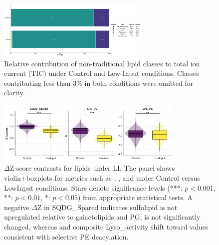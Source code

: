 \documentclass[10pt,letterpaper]{article}
\begin{document}





\begin{figure}[htp]
  \centering
  \includegraphics[width=0.65\textwidth]{fig/supp/SuppFig_4_TIC_nontraditional_lipid_class.png}
  \caption{Relative contribution of non-traditional lipid classes to total ion current (TIC) under Control and Low-Input conditions. Classes contributing less than 3\% in both conditions were omitted for clarity.}
  \label{fig:S4_TIC_nontraditional}
\end{figure}



\begin{figure}[htp]
  \centering
  \includegraphics[width=0.8\textwidth]{fig/supp/SuppFig_4_lipid_ratio_linear_lowP.png}
  \caption{$\Delta$Z-score contrasts for lipids under LI. 
    The panel shows violin+boxplots for metrics such as , , and  under Control versus LowInput conditions. 
    Stars denote significance levels (***: $p<0.001$, **: $p<0.01$, *: $p<0.05$) from appropriate statistical tests. 
    A negative $\Delta$Z in SQDG\_Spared indicates sulfolipid is not upregulated relative to galactolipids and PG; 
     is not significantly changed, whereas  and composite Lyso\_activity shift toward values consistent with selective PE deacylation.}
  \label{fig:S4_lipid_ratio_lowP}
\end{figure}
\end{document}
